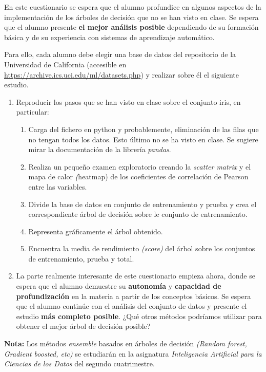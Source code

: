 \documentclass{mulcia_aa}
\begin{document}
\genTitle

En este cuestionario se espera que el alumno profundice en algunos aspectos de la implementación de los árboles de decisión que no se han visto en clase. Se espera que el alumno presente \textbf{el mejor análisis posible} dependiendo de su formación básica y de su experiencia con sistemas de aprendizaje automático.

Para ello, cada alumno debe elegir una base de datos del repositorio de la Universidad de California (accesible en \hyperlink{https://archive.ics.uci.edu/ml/datasets.php}{https://archive.ics.uci.edu/ml/datasets.php}) y realizar sobre él el siguiente estudio.

\begin{enumerate}
    \item Reproducir los pasos que se han visto en clase sobre el conjunto iris, en particular:
    
    \begin{enumerate}[label=\emph{\alph*)}]
        \item Carga del fichero en python y probablemente, eliminación de las filas que no tengan todos los datos. Esto último no se ha visto en clase. Se sugiere mirar la documentación de la librería \emph{pandas}.
        
        \item Realiza un pequeño examen exploratorio creando la \emph{scatter matrix} y el mapa de calor \emph{(}heatmap) de los coeficientes de correlación de Pearson entre las variables.
        
        \item Divide la base de datos en conjunto de entrenamiento y prueba y crea el correspondiente árbol de decisión sobre le conjunto de entrenamiento.
        
        \item Representa gráficamente el árbol obtenido.
        
        \item Encuentra la media de rendimiento \emph{(score)} del árbol sobre los conjuntos de entrenamiento, prueba y total.
    \end{enumerate}
        
    \item La parte realmente interesante de este cuestionario empieza ahora, donde se espera que el alumno demuestre su \textbf{autonomía} y \textbf{capacidad de profundización} en la materia a partir de los conceptos básicos. Se espera que el alumno continúe con el análisis del conjunto de datos y presente el estudio \textbf{más completo posible}. ¿Qué otros métodos podríamos utilizar para obtener el mejor árbol de decisión posible?
\end{enumerate}

\textbf{Nota:} Los métodos \emph{ensemble} basados en árboles de decisión \emph{(Random forest, Gradient boosted, etc)} se estudiarán en la asignatura \emph{Inteligencia Artificial para la Ciencias de los Datos} del segundo cuatrimestre.
\end{document}
